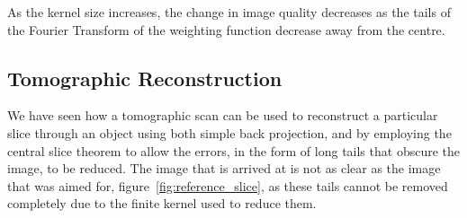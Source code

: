         As the kernel size increases, the change in image quality decreases as the tails of the Fourier Transform of the weighting function decrease away from the centre.

    \subsection{Tomographic Reconstruction} %
    \label{sub:tomographic_reconstruction}
        We have seen how a tomographic scan can be used to reconstruct a particular slice through an object using both simple back projection, and by employing the central slice theorem to allow the errors, in the form of long tails that obscure the image, to be reduced. The image that is arrived at is not as clear as the image that was aimed for, figure~\ref{fig:reference_slice}, as these tails cannot be removed completely due to the finite kernel used to reduce them.



